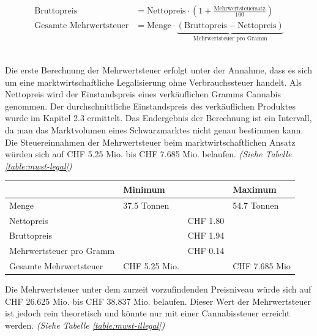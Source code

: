 \documentclass[../main.tex]{subfiles}
\begin{document}
	 \noindent
	 \begin{align}
	 	 \text{Bruttopreis} &= \text{Nettopreis} \cdot \left( 1 + \frac{\text{Mehrwertsteuersatz}}{100} \right)\label{equ:brutto} \\[7pt]
	 	\text{Gesamte Mehrwertsteuer} &= \text{Menge} \cdot \underbrace{\left(\text{Bruttopreis} - \text{Nettopreis} \right)}_{\text{Mehrwertsteuer pro Gramm}} \label{equ:mwst} 
	 \end{align}
	 
	 \noindent\\
	 Die erste Berechnung der Mehrwertsteuer erfolgt unter der Annahme, dass es sich um eine marktwirtschaftliche Legalisierung ohne Verbrauchssteuer handelt.
	 Als Nettopreis wird der Einstandspreis eines verkäuflichen Gramms Cannabis genommen.
	 Der durchschnittliche Einstandspreis des verkäuflichen Produktes wurde im Kapitel 2.3 ermittelt.
	 Das Endergebnis der Berechnung ist ein Intervall, da man das Marktvolumen eines Schwarzmarktes nicht genau bestimmen kann. 
	 Die Steuereinnahmen der Mehrwertsteuer beim marktwirtschaftlichen Ansatz würden sich auf CHF 5.25 Mio. bis CHF 7.685 Mio. belaufen.
	 \textit{(Siehe Tabelle \ref{table:mwst-legal})}
	 
	 \noindent
	 \captionsetup{font=small}
	 \label{table:mwst-legal}
	 \begin{tabularx}{\textwidth}{X p{3.5cm} p{2.5cm} p{3.5cm}}
     	\toprule
     	\phantom{x} & Minimum & & Maximum \\
        \midrule
        Menge & 37.5 Tonnen & & 54.7 Tonnen\\
        \midrule
        Nettopreis & & CHF 1.80 & \\
        \midrule
        Bruttopreis & & CHF 1.94 & \\
        \midrule
        Mehrwertsteuer pro Gramm & & CHF 0.14 & \\
        \midrule
        Gesamte Mehrwertsteuer & CHF 5.25 Mio. & & CHF 7.685 Mio\\
        \bottomrule
     \end{tabularx}\pagebreak
     
     \noindent
     Die Mehrwertsteuer unter dem zurzeit vorzufindenden Preisniveau würde sich auf CHF 26.625 Mio. bis CHF 38.837 Mio. belaufen.
     Dieser Wert der Mehrwertsteuer ist jedoch rein theoretisch und könnte nur mit einer Cannabissteuer erreicht werden.
	 \textit{(Siehe Tabelle \ref{table:mwst-illegal})}
     
\end{document}
